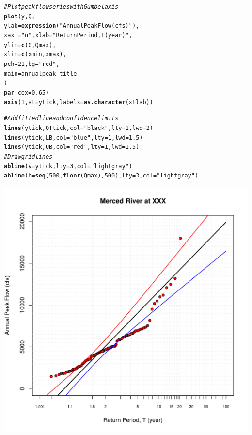 \documentclass{article}\usepackage[]{graphicx}\usepackage[]{color}
\makeatletter
\def\maxwidth{ %
  \ifdim\Gin@nat@width>\linewidth
    \linewidth
  \else
    \Gin@nat@width
  \fi
}
\newcommand{\hlnum}[1]{\textcolor[rgb]{0.686,0.059,0.569}{#1}}%
\newcommand{\hlstr}[1]{\textcolor[rgb]{0.192,0.494,0.8}{#1}}%
\newcommand{\hlcom}[1]{\textcolor[rgb]{0.678,0.584,0.686}{\textit{#1}}}%
\newcommand{\hlstd}[1]{\textcolor[rgb]{0.345,0.345,0.345}{#1}}%
\newcommand{\hlkwc}[1]{\textcolor[rgb]{0.333,0.667,0.333}{#1}}%
\newcommand{\hlkwd}[1]{\textcolor[rgb]{0.737,0.353,0.396}{\textbf{#1}}}%
\newenvironment{kframe}{%
 \def\at@end@of@kframe{}%
 \ifinner\ifhmode%
  \def\at@end@of@kframe{\end{minipage}}%
  \begin{minipage}{\columnwidth}%
 \fi\fi%
 \def\FrameCommand##1{\hskip\@totalleftmargin \hskip-\fboxsep
 \colorbox{shadecolor}{##1}\hskip-\fboxsep
     \hskip-\linewidth \hskip-\@totalleftmargin \hskip\columnwidth}%
 \MakeFramed {\advance\hsize-\width
   \@totalleftmargin\z@ \linewidth\hsize
   \@setminipage}}%
 {\par\unskip\endMakeFramed%
 \at@end@of@kframe}
\newenvironment{knitrout}{}{} %
\makeatother
\begin{document}
\begin{knitrout}
\begin{kframe}
\begin{alltt}
\hlcom{# Plot peak flow series with Gumbel axis}
\hlkwd{plot}\hlstd{(y, Q,}
     \hlkwc{ylab} \hlstd{=} \hlkwd{expression}\hlstd{(} \hlstr{"Annual Peak Flow (cfs)"} \hlstd{) ,}
     \hlkwc{xaxt} \hlstd{=} \hlstr{"n"}\hlstd{,} \hlkwc{xlab} \hlstd{=} \hlstr{"Return Period, T (year)"}\hlstd{,}
     \hlkwc{ylim} \hlstd{=} \hlkwd{c}\hlstd{(}\hlnum{0}\hlstd{, Qmax),}
     \hlkwc{xlim} \hlstd{=} \hlkwd{c}\hlstd{(xmin, xmax),}
     \hlkwc{pch} \hlstd{=} \hlnum{21}\hlstd{,} \hlkwc{bg} \hlstd{=} \hlstr{"red"}\hlstd{,}
     \hlkwc{main} \hlstd{= annualpeak_title}
\hlstd{)}
\hlkwd{par}\hlstd{(}\hlkwc{cex} \hlstd{=} \hlnum{0.65}\hlstd{)}
\hlkwd{axis}\hlstd{(}\hlnum{1}\hlstd{,} \hlkwc{at} \hlstd{= ytick,} \hlkwc{labels} \hlstd{=} \hlkwd{as.character}\hlstd{(xtlab))}

\hlcom{# Add fitted line and confidence limits}
\hlkwd{lines}\hlstd{(ytick, QTtick,} \hlkwc{col} \hlstd{=} \hlstr{"black"}\hlstd{,} \hlkwc{lty}\hlstd{=}\hlnum{1}\hlstd{,} \hlkwc{lwd}\hlstd{=}\hlnum{2}\hlstd{)}
\hlkwd{lines}\hlstd{(ytick, LB,} \hlkwc{col} \hlstd{=} \hlstr{"blue"}\hlstd{,} \hlkwc{lty} \hlstd{=} \hlnum{1}\hlstd{,} \hlkwc{lwd}\hlstd{=}\hlnum{1.5}\hlstd{)}
\hlkwd{lines}\hlstd{(ytick, UB,} \hlkwc{col} \hlstd{=} \hlstr{"red"}\hlstd{,} \hlkwc{lty} \hlstd{=} \hlnum{1}\hlstd{,} \hlkwc{lwd}\hlstd{=}\hlnum{1.5}\hlstd{)}
\hlcom{# Draw grid lines}
\hlkwd{abline}\hlstd{(}\hlkwc{v} \hlstd{= ytick,} \hlkwc{lty} \hlstd{=} \hlnum{3}\hlstd{,} \hlkwc{col}\hlstd{=}\hlstr{"light gray"}\hlstd{)}
\hlkwd{abline}\hlstd{(}\hlkwc{h} \hlstd{=} \hlkwd{seq}\hlstd{(}\hlnum{500}\hlstd{,} \hlkwd{floor}\hlstd{(Qmax),} \hlnum{500}\hlstd{),} \hlkwc{lty} \hlstd{=} \hlnum{3}\hlstd{,}\hlkwc{col}\hlstd{=}\hlstr{"light gray"}\hlstd{)}
\end{alltt}
\end{kframe}
\includegraphics[width=\maxwidth]{figure/unnamed-chunk-4-1} 

\end{knitrout}
\end{document}
